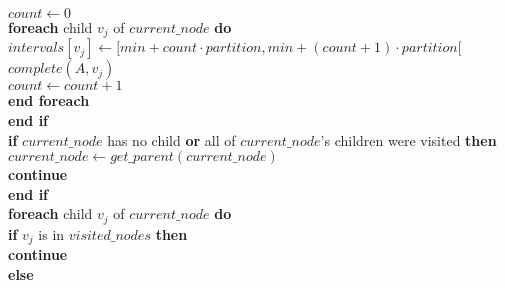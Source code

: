 \begin{algorithm}
\begin{algorithmic}
\hspace{0.6cm} $count \gets 0$\\

\hspace{0.6cm} \textbf{foreach} child $v_{j}$ of $current\_node$ \textbf{do}\\

\hspace{0.9cm} $intervals[v_{j}] \gets [min + count \cdot  partition, min + (count+1) \cdot  partition[$\\

\hspace{0.9cm} $complete(A, v_{j})$\\

\hspace{0.9cm} $count \gets count + 1$\\

\hspace{0.6cm} \textbf{end foreach}\\

\hspace{0.3cm} \textbf{end if}\\

\hspace{0.3cm} \textbf{if} $current\_node$ has no child \textbf{or} all of $current\_node$'s children were visited \textbf{then}\\

\hspace{0.6cm} $current\_node \gets get\_parent(current\_node)$\\

\hspace{0.6cm} \textbf{continue}\\

\hspace{0.3cm} \textbf{end if}\\

\hspace{0.3cm} \textbf{foreach} child $v_{j}$ of $current\_node$ \textbf{do}\\

\hspace{0.6cm} \textbf{if} $v_{j}$ is in $visited\_nodes$ \textbf{then}\\

\hspace{0.9cm} \textbf{continue} \\

\hspace{0.6cm} \textbf{else}\\


\end{algorithmic}
\end{algorithm}
